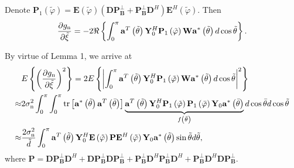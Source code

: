 \documentclass[12pt, draftclsnofoot, onecolumn]{IEEEtran}
\begin{document}
Denote ${\mathbf{P}}_{1}\left( {\tilde{\varphi }} \right) =  \mathbf{E}\left( {\tilde{\varphi }} \right)\left( \mathbf{DP}_{\mathbf{B}}^{\bot }+\mathbf{P}_{\mathbf{B}}^{\bot }{{\mathbf{D}}^{H}} \right){{\mathbf{E}}^{H}}\left( {\tilde{\varphi }} \right) $. Then
\begin{align*}
\frac{\partial {{g}_{\mathrm{n}}}}{\partial \tilde{\xi }} = -2\Re \left\{ \int_{0}^{ \rm{\pi} } {{{\mathbf{a}}^{T}}\left( {\tilde{\theta }} \right)\mathbf{Y}_{0}^{H}{\mathbf{P}}_{1}\left( {\tilde{\varphi }} \right)\mathbf{W}{{\mathbf{a}}^{*}}\left( {\tilde{\theta }} \right)d\cos \tilde{\theta }} \right\}.
\end{align*}

By virtue of Lemma 1, we arrive at
\begin{align}\label{Lemma1_usage}
  & E\left\{ {{\left( \frac{\partial {g_{\mathrm{n}}}}{\partial \tilde{\xi }} \right)}^{2}} \right\} = 2E\left\{ {{\left| \int_{0}^{ \rm{\pi} }{{{\mathbf{a}}^{T}}\left( {\tilde{\theta }} \right)\mathbf{Y}_{0}^{H}{\mathbf{P}}_{1}\left( {\tilde{\varphi }} \right) \mathbf{W}{{\mathbf{a}}^{*}}\left( {\tilde{\theta }} \right)d\cos \tilde{\theta }} \right|}^{2}} \right\} \nonumber \\
\approx & 2\sigma _{\mathrm{n}}^{2}\int_{0}^{ \rm{\pi} }\int_{0}^{ \rm{\pi} }
\operatorname{tr} \left[ {{\mathbf{a}}^{*}}\left( {\tilde{\theta }} \right) {{\mathbf{a}}^{T}}\left( {\bar{\theta }} \right) \right] \underbrace{{{\mathbf{a}}^{T}}\left( {\tilde{\theta }} \right)\mathbf{Y}_{0}^{H}{\mathbf{P}}_{1}\left( {\tilde{\varphi }} \right) {\mathbf{P}}_{1}\left( {\bar{\varphi }} \right) {{\mathbf{Y}}_{0}}{{\mathbf{a}}^{*}}\left( {\bar{\theta }} \right)}_{f\left( \bar{\theta} \right)} d\cos \bar{\theta }d\cos \tilde{\theta } \nonumber \\
 \approx & \frac{2\sigma _{\mathrm{n}}^{2}}{\tilde{d}}\int_{0}^{ \rm{\pi} }{{\mathbf{a}}^{T}}\left( {\tilde{\theta }} \right)\mathbf{Y}_{0}^{H}\mathbf{E}\left( {\tilde{\varphi }} \right)\mathbf{P} {{\mathbf{E}}^{H}}\left( {\tilde{\varphi }} \right){{\mathbf{Y}}_{0}}{{\mathbf{a}}^{*}}\left( {\tilde{\theta }} \right)\sin \tilde{\theta }d\tilde{\theta },
\end{align}
where $\mathbf{P} =\mathbf{DP}_{\mathbf{B}}^{\bot }{{\mathbf{D}}^{H}}+\mathbf{DP}_{\mathbf{B}}^{\bot }\mathbf{DP}_{\mathbf{B}}^{\bot }+\mathbf{P}_{\mathbf{B}}^{\bot }{{\mathbf{D}}^{H}}\mathbf{P}_{\mathbf{B}}^{\bot }{{\mathbf{D}}^{H}}+\mathbf{P}_{\mathbf{B}}^{\bot }{{\mathbf{D}}^{H}}\mathbf{DP}_{\mathbf{B}}^{\bot }$.
\end{document}

